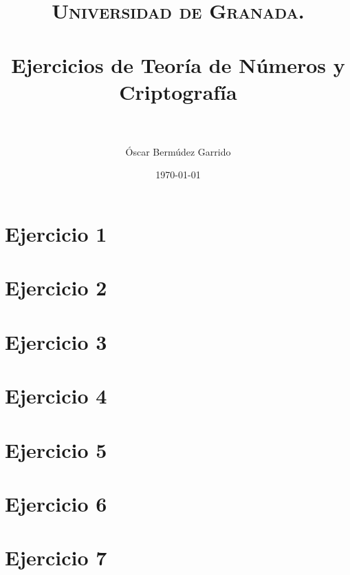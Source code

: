 \documentclass[paper=a4, fontsize=11pt, spanish]{scrartcl}
\title{
  \normalfont \normalsize 
  \textsc{Universidad de Granada.} \\ [25pt] %
  \horrule{0.5pt} \\[0.4cm] %
  \huge Ejercicios de Teoría de Números y Criptografía \\ %
  \horrule{2pt} \\[0.5cm] %
}
\author{Óscar Bermúdez Garrido} %
\date{\normalsize\today} %
\begin{document}
	\maketitle %
	
	\newpage
	\tableofcontents %
	\newpage

	\section{Ejercicio 1}

	\section{Ejercicio 2}

	\section{Ejercicio 3}

	\section{Ejercicio 4}

	\section{Ejercicio 5}

	\section{Ejercicio 6}

	\section{Ejercicio 7}
	
\end{document}
